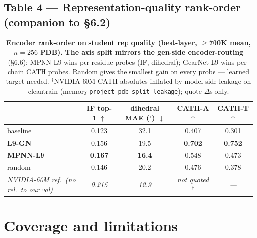 \documentclass[11pt,a4paper]{article}
\begin{document}
\subsection*{Table 4 --- Representation-quality rank-order (companion to \S6.2)}

\begin{table}[h]
\centering
\small
\begin{tabular}{lcccc}
\toprule
& IF top-1 $\uparrow$ & dihedral MAE ($^\circ$) $\downarrow$ & CATH-A $\uparrow$ & CATH-T $\uparrow$ \\
\midrule
baseline      & 0.123 & 32.1 & 0.407 & 0.301 \\
\textbf{L9-GN}        & 0.156 & 19.5 & \textbf{0.702} & \textbf{0.752} \\
\textbf{MPNN-L9}      & \textbf{0.167} & \textbf{16.4} & 0.548 & 0.473 \\
random        & 0.146 & 20.2 & 0.476 & 0.378 \\
\textit{NVIDIA-60M ref.\ (no rel.\ to our val)} & \textit{0.215} & \textit{12.9} & \textit{not quoted}$^\dagger$ & \textit{---} \\
\bottomrule
\end{tabular}
\caption{\textbf{Encoder rank-order on student rep quality (best-layer,
$\ge$700K mean, $n{=}256$ PDB).} \textbf{The axis split mirrors the
gen-side encoder-routing} (\S6.6): MPNN-L9 wins per-residue probes
(IF, dihedral); GearNet-L9 wins per-chain CATH probes. Random
gives the smallest gain on every probe --- learned target needed.
$^\dagger$NVIDIA-60M CATH absolutes inflated by model-side leakage
on cleantrain (memory \texttt{project\_pdb\_split\_leakage}); quote
$\Delta$s only.}
\end{table}

\section{Coverage and limitations}
\end{document}
